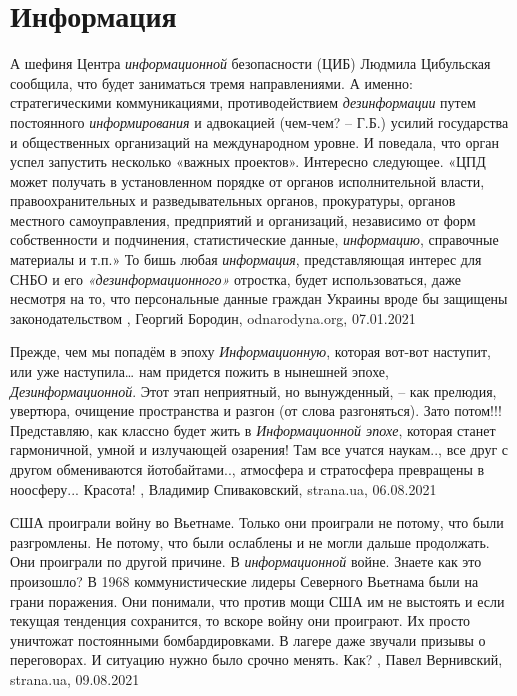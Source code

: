  
 
 
 
 
\chapter{Информация}
\label{sec:slova.informacia}

А  шефиня Центра \emph{информационной} безопасности (ЦИБ) Людмила Цибульская
сообщила, что будет заниматься тремя направлениями. А именно: стратегическими
коммуникациями, противодействием \emph{дезинформации} путем постоянного
\emph{информирования} и адвокацией (чем-чем? – Г.Б.) усилий государства и
общественных организаций на международном уровне. И поведала, что орган успел
запустить несколько «важных проектов».  Интересно следующее. «ЦПД может
получать в установленном порядке от органов исполнительной власти,
правоохранительных и разведывательных органов, прокуратуры, органов местного
самоуправления, предприятий и организаций, независимо от форм собственности и
подчинения, статистические данные, \emph{информацию}, справочные материалы и
т.п.» То бишь любая \emph{информация}, представляющая интерес для СНБО и его
\emph{«дезинформационного»} отростка, будет использоваться, даже несмотря на
то, что персональные данные граждан Украины вроде бы защищены законодательством
, Георгий Бородин, odnarodyna.org, 07.01.2021


Прежде, чем мы попадём в эпоху \emph{Информационную}, которая вот-вот наступит,
или уже наступила… нам придется пожить в нынешней эпохе,
\emph{Дезинформационной}.  Этот этап неприятный, но вынужденный, – как
прелюдия, увертюра, очищение пространства и разгон (от слова разгоняться).
Зато потом!!!  Представляю, как классно будет жить в \emph{Информационной
эпохе}, которая станет гармоничной, умной и излучающей озарения!  Там все
учатся наукам.., все друг с другом обмениваются йотобайтами.., атмосфера и
стратосфера превращены в ноосферу... Красота!
, 
Владимир Спиваковский, strana.ua, 06.08.2021

США проиграли войну во Вьетнаме.  Только они проиграли не потому, что были
разгромлены. Не потому, что были ослаблены и не могли дальше продолжать.  Они
проиграли по другой причине. В \emph{информационной} войне.  Знаете как это произошло?
В 1968 коммунистические лидеры Северного Вьетнама были на грани поражения. Они
понимали, что против мощи США им не выстоять и если текущая тенденция
сохранится, то вскоре войну они проиграют. Их просто уничтожат постоянными
бомбардировками. В лагере даже звучали призывы о переговорах. И ситуацию нужно
было срочно менять.  Как?
, 
Павел Вернивский, strana.ua, 09.08.2021
